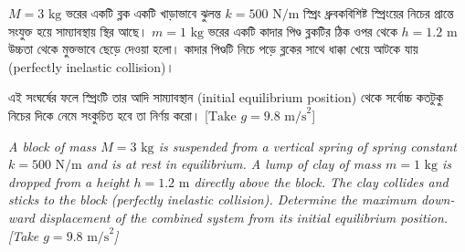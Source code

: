 \documentclass[12pt, a4paper]{article}
\begin{document}
\begin{tcolorbox}[questionbox={প্রশ্ন (Question) 6}]
\noindent
$M = 3\text{ kg}$ ভরের একটি ব্লক একটি খাড়াভাবে ঝুলন্ত $k = 500\text{ N/m}$ স্প্রিং ধ্রুবকবিশিষ্ট স্প্রিংয়ের নিচের প্রান্তে সংযুক্ত হয়ে সাম্যাবস্থায় স্থির আছে। $m = 1\text{ kg}$ ভরের একটি কাদার পিণ্ড ব্লকটির ঠিক ওপর থেকে $h = 1.2\text{ m}$ উচ্চতা থেকে মুক্তভাবে ছেড়ে দেওয়া হলো। কাদার পিণ্ডটি নিচে পড়ে ব্লকের সাথে ধাক্কা খেয়ে আটকে যায় (perfectly inelastic collision)। 

\vspace{0.3em}
\noindent
এই সংঘর্ষের ফলে স্প্রিংটি তার আদি সাম্যাবস্থান (initial equilibrium position) থেকে সর্বোচ্চ কতটুকু নিচের দিকে নেমে সংকুচিত হবে তা নির্ণয় করো। [$\text{Take } g = 9.8\text{ m/s}^2$]

\vspace{0.8em}
\begin{english}
\noindent\textit{\color{darkgray}
A block of mass $M = 3\text{ kg}$ is suspended from a vertical spring of spring constant $k = 500\text{ N/m}$ and is at rest in equilibrium. A lump of clay of mass $m = 1\text{ kg}$ is dropped from a height $h = 1.2\text{ m}$ directly above the block. The clay collides and sticks to the block (perfectly inelastic collision). Determine the maximum downward displacement of the combined system from its initial equilibrium position. [Take $g = 9.8\text{ m/s}^2$]
}
\end{english}
\end{tcolorbox}
\end{document}
